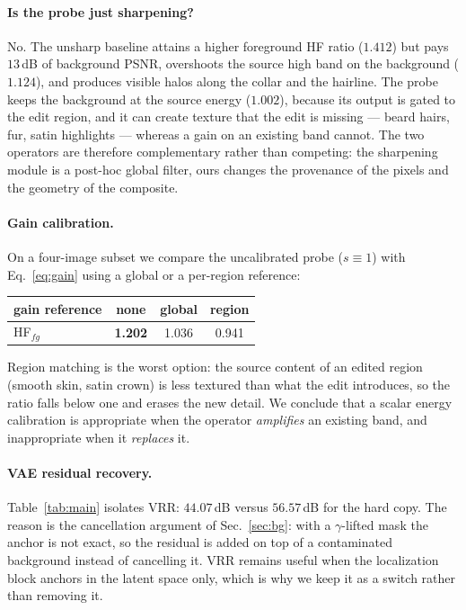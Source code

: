 \documentclass[10pt,twocolumn,letterpaper]{article}
\begin{document}
\paragraph{Is the probe just sharpening?}
\label{sec:vs_sharp}
No. The unsharp baseline attains a higher foreground HF ratio ($1.412$) but pays
$13$\,dB of background PSNR, overshoots the source high band on the background
($1.124$), and produces visible halos along the collar and the hairline. The
probe keeps the background at the source energy ($1.002$), because its output is
gated to the edit region, and it can create texture that the edit is missing ---
beard hairs, fur, satin highlights --- whereas a gain on an existing band cannot.
The two operators are therefore complementary rather than competing: the
sharpening module is a post-hoc global filter, ours changes the provenance of the
pixels and the geometry of the composite.

\paragraph{Gain calibration.}
On a four-image subset we compare the uncalibrated probe ($s\equiv 1$) with
Eq.~\eqref{eq:gain} using a global or a per-region reference:

\begin{center}
\small
\begin{tabular}{lccc}
\toprule
gain reference & none & global & region \\
\midrule
HF$_{fg}$ & \textbf{1.202} & 1.036 & 0.941 \\
\bottomrule
\end{tabular}
\end{center}

Region matching is the worst option: the source content of an edited region
(smooth skin, satin crown) is less textured than what the edit introduces, so the
ratio falls below one and erases the new detail. We conclude that a scalar energy
calibration is appropriate when the operator \emph{amplifies} an existing band,
and inappropriate when it \emph{replaces} it.

\paragraph{VAE residual recovery.}
Table~\ref{tab:main} isolates VRR: $44.07$\,dB versus $56.57$\,dB for the hard
copy. The reason is the cancellation argument of Sec.~\ref{sec:bg}: with a
$\gamma$-lifted mask the anchor is not exact, so the residual is added on top of
a contaminated background instead of cancelling it. VRR remains useful when the
localization block anchors in the latent space only, which is why we keep it as a
switch rather than removing it.
\end{document}

